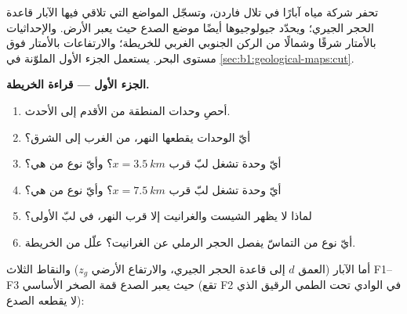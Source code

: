 \begin{problem}
\label{pb:b1:geological-maps:1}
تحفر شركة مياه آبارًا في تلال فاردن، وتسجّل المواضع التي تلاقي فيها الآبار قاعدة الحجر الجيري؛ ويحدّد جيولوجيوها أيضًا موضع الصدع حيث يعبر الأرض. والإحداثيات بالأمتار شرقًا وشمالًا من الركن الجنوبي الغربي للخريطة؛ والارتفاعات بالأمتار فوق مستوى البحر. يستعمل الجزء الأول  الملوّنة في \cref{sec:b1:geological-maps:cut}.

\medskip
\noindent\textbf{الجزء الأول --- قراءة الخريطة.}
\begin{enumerate}
  \item أحصِ وحدات المنطقة من الأقدم إلى الأحدث.
  \item أيّ الوحدات يقطعها النهر، من الغرب إلى الشرق؟
  \item أيّ وحدة تشغل لبّ  قرب $x = \qty{3.5}{km}$؟ وأيّ نوع من  هي؟
  \item أيّ وحدة تشغل لبّ  قرب $x = \qty{7.5}{km}$؟ وأيّ نوع من  هي؟
  \item لماذا لا يظهر الشيست والغرانيت إلا قرب النهر، في لبّ  الأولى؟
  \item أيّ نوع من التماسّ يفصل الحجر الرملي عن الغرانيت؟ علّل من الخريطة.
\end{enumerate}

\medskip
أما الآبار (العمق $d$ إلى قاعدة الحجر الجيري، والارتفاع الأرضي $z_g$) والنقاط الثلاث F1–F3 حيث يعبر الصدع قمة الصخر الأساسي (تقع F2 في الوادي تحت الطمي الرقيق الذي لا يقطعه الصدع): 


\end{problem}

